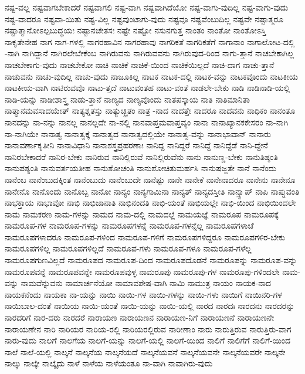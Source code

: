 {ನಷ್ಟ-ವಲ್ಲ
ನಷ್ಟವಾಗಬೇಕಾದರೆ
ನಷ್ಟವಾಗಲಿ
ನಷ್ಟ-ವಾಗಿ
ನಷ್ಟವಾಗಿದೆಯೋ
ನಷ್ಟ-ವಾಗು-ವುದಿಲ್ಲ
ನಷ್ಟ-ವಾಗು-ವುದು
ನಷ್ಟ-ವಾದರೂ
ನಷ್ಟವಾ-ಯಿತು
ನಷ್ಟ-ವಿಲ್ಲ
ನಷ್ಟವುಂಟಾಗು-ವುದು
ನಷ್ಟವೂ
ನಷ್ಟವೆಂಬುದಿಲ್ಲ
ನಷ್ಟವೇ
ನಷ್ಟಾತ್ಮರೂ
ನಷ್ಟಾತ್ಮಾನೋಽಲ್ಪಬುದ್ಧಯಃ
ನಷ್ಟಾನಚೇತಸಃ
ನಷ್ಟೇ
ನಷ್ಟೋ
ನಸುನಗುತ್ತ
ನಾಂತಂ
ನಾಂತೋ
ನಾಂತೋಽಸ್ತಿ
ನಾಕೃತೇನೇಹ
ನಾಗ
ನಾಗ-ಗಳಲ್ಲಿ
ನಾಗರಹಾವಿನ
ನಾಗರಹಾವು
ನಾಗರಿಕತೆ
ನಾಗರಿಕತೆಗೆ
ನಾಗಾನಾಂ
ನಾಗಾಲೋಟ-ದಲ್ಲಿ
-ನಾಗಿ
ನಾಗಿದ್ದಾನೆ
ನಾಗಿರಲೇಬೇಕೆಂಬ
ನಾಗಿರುವನು
ನಾಗಿರುವವನು
ನಾಗಿರುವುದ-ರಿಂದ
ನಾಗು-ತ್ತಾನೆ
ನಾಚಬೇಕಾಗಿಲ್ಲ
ನಾಚಬೇಕಾಗು-ವುದು
ನಾಚಬೇಕೋ
ನಾಚಿ
ನಾಚಿಕೆ
ನಾಚಿಕೆ-ಯಿಂದ
ನಾಚಿಕೆಯಿಲ್ಲದೆ
ನಾಚಿ-ದಾಗ
ನಾಚು-ತ್ತಾನೆ
ನಾಚುವನು
ನಾಚು-ವುದಿಲ್ಲ
ನಾಚು-ವುದು
ನಾಜೂಕಿಲ್ಲ
ನಾಟಕ
ನಾಟಕ-ದಲ್ಲಿ
ನಾಟಕ-ವನ್ನು
ನಾಟಕವೊಂದು
ನಾಟಕೀಯ
ನಾಟಕೀಯ-ವಾಗಿ
ನಾಟಿರುವವೊ
ನಾಟು-ತ್ತದೆ
ನಾಟುವಂತಹ
ನಾಟು-ವಂತೆ
ನಾಡಲೇ-ಬೇಕು
ನಾಡಿ
ನಾಡಿನಾಡಿ-ಯಲ್ಲಿ
ನಾಡಿ-ಯನ್ನು
ನಾಡೀಶಾಸ್ತ್ರ
ನಾಡು-ತ್ತಾನೆ
ನಾಣ್ಯದ
ನಾಣ್ಯವೊಂದು
ನಾತಪಸ್ಕಾಯ
ನಾತಿ
ನಾತಿಮಾನಿತಾ
ನಾತ್ಮಾನಮವಸಾದಯೇತ್
ನಾತ್ಯಶ್ನತಸ್ತು
ನಾತ್ಯುಚ್ಛ್ರಿತಂ
ನಾತ್ರ
-ನಾದ
ನಾದತ್ತೇ
ನಾದರೂ
ನಾದವನು
ನಾಧಿಕಂ
ನಾನಂತೂ
ನಾನದನ್ನು
ನಾ-ನನ್ನು
ನಾನಲ್ಲ
ನಾನಲ್ಲದೇ
ನಾ-ನಲ್ಲಿ
ನಾನವಾಪ್ತಮವಾಪ್ತವ್ಯಂ
ನಾನಾ
ನಾನಾಖ್ಯಾನಕಕೇಸರಂ
ನಾ-ನಾಗಿ
ನಾ-ನಾಗಿಯೇ
ನಾನಾತ್ವ
ನಾನಾತ್ವಕ್ಕೆ
ನಾನಾತ್ವದ
ನಾನಾತ್ವದಲ್ಲಿಯೇ
ನಾನಾತ್ವ-ವನ್ನು
ನಾನಾಭಾವಾನ್
ನಾನಾರು
ನಾನಾವರ್ಣಾಕೃತೀನಿ
ನಾನಾವಿಧಾನಿ
ನಾನಾಶಸ್ತ್ರಪ್ರಹರಣಾಃ
ನಾನಿದ್ದ
ನಾನಿದ್ದರೆ
ನಾನಿದ್ದೆ
ನಾನಿದ್ದೆಡೆ
ನಾನಿ-ದ್ದೇನೆ
ನಾನಿರಬೇಕಾದರೆ
ನಾನಿರ-ಬೇಕು
ನಾನಿರುವ
ನಾನಿಲ್ಲಿರುವೆ
ನಾನಿಲ್ಲಿರುವೆನು
ನಾನು
ನಾನುಣ್ಣ-ಬೇಕು
ನಾನುತಿಷ್ಠಂತಿ
ನಾನುಪಶ್ಯಂತಿ
ನಾನುವರ್ತಯತೀಹ
ನಾನುಶೋಚಂತಿ
ನಾನುಶೋಚಿತುಮರ್ಹಸಿ
ನಾನುಷಜ್ಜತೇ
ನಾನೆ
ನಾನೆಂದು
ನಾನೆಂಬ
ನಾನೆಂಬುದಕ್ಕಿಂತ
ನಾನೆಂಬುದು
ನಾನೆಂಬುದೇ
ನಾನೆಷ್ಟು
ನಾನೇ
ನಾನೇಕೆ
ನಾನೇನಾದರೂ
ನಾನೇನು
ನಾನೇನೂ
ನಾನೇನೊ
ನಾನೊಂದು
ನಾನೊಬ್ಬ
ನಾನೋ
ನಾನ್ಯಂ
ನಾನ್ಯಗಾಮಿನಾ
ನಾನ್ಯತ್
ನಾನ್ಯದಸ್ತೀತಿ
ನಾನ್ಸ್ಟಾಪ್
ನಾಪಿ
ನಾಪ್ನುವಂತಿ
ನಾಭಕ್ತಾಯ
ನಾಭಾವೋ
ನಾಭಿ
ನಾಭಿಜಾನಾತಿ
ನಾಭಿನಂದತಿ
ನಾಭಿ-ಯಂತೆ
ನಾಭಿಯಲ್ಲೇ
ನಾಭಿ-ಯಿಂದ
ನಾಭಿಯಿಂದಲೇ
ನಾಮ
ನಾಮಕರಣ
ನಾಮ-ಗಳನ್ನು
ನಾಮದ
ನಾಮ-ದಲ್ಲಿ
ನಾಮದಲ್ಲೆ
ನಾಮಯಜ್ಞೆ
ನಾಮರೂಪ
ನಾಮರೂಪಕ್ಕೆ
ನಾಮರೂಪ-ಗಳ
ನಾಮರೂಪ-ಗಳನ್ನು
ನಾಮರೂಪಗಳನ್ನೆ
ನಾಮರೂಪ-ಗಳನ್ನೆಲ್ಲ
ನಾಮರೂಪಗಳಾಚೆ
ನಾಮರೂಪಗಳಾದರೂ
ನಾಮರೂಪ-ಗಳಿಂದ
ನಾಮರೂಪ-ಗಳಿಗೆ
ನಾಮರೂಪಗಳಿದ್ದರೂ
ನಾಮರೂಪಗಳಿರ-ಬೇಕು
ನಾಮರೂಪಗಳಿಲ್ಲ
ನಾಮರೂಪಗಳಿಲ್ಲದೆ
ನಾಮರೂಪ-ಗಳು
ನಾಮರೂಪ-ಗಳೂ
ನಾಮರೂಪ-ಗಳೆಲ್ಲ
ನಾಮರೂಪಗುಣವಿಲ್ಲದೆ
ನಾಮರೂಪದ
ನಾಮರೂಪ-ದಿಂದ
ನಾಮರೂಪದೊಡನೆ
ನಾಮರೂಪನ್ನು
ನಾಮರೂಪ-ವನ್ನು
ನಾಮರೂಪವನ್ನೆ
ನಾಮರೂಪವನ್ನೇ
ನಾಮರೂಪವುಳ್ಳ
ನಾಮರೂಪು
ನಾಮರೂಪು-ಗಳ
ನಾಮರೂಪು-ಗಳಿಂದಲೇ
ನಾಮ-ವನ್ನು
ನಾಮವೆನ್ನುವನು
ನಾಮಾರ್ಚನೆಯೋ
ನಾಮಾವಶೇಷ-ವಾಗಿ
ನಾಮಿ
ನಾಮುತ್ರ
ನಾಯಂ
ನಾಯಕ-ನಾದ
ನಾಯಕನೆಂದು
ನಾಯಕಾ
ನಾ-ಯನ್ನು
ನಾಯಿ
ನಾಯಿ-ಗಳ
ನಾಯಿ-ಗಳನ್ನು
ನಾಯಿ-ಗಳು
ನಾಯಿಗೆ
ನಾಯಿನರಿ-ಗಳ
ನಾಯಿಬಾಲ-ದಂತೆ
ನಾಯಿಯ
ನಾಯಿ-ಯಂತೆ
ನಾಯಿ-ಯನ್ನು
ನಾಯಿ-ಯಲ್ಲಿ
ನಾರದ
ನಾರದಃ
ನಾರದನು
ನಾರದರನ್ನು
ನಾರದರಿಗೆ
ನಾರ-ದರು
ನಾರದರೆ
ನಾರಾಯಣ
ನಾರಾಯಣನ
ನಾರಾಯಣ-ನಿಗೆ
ನಾರಾಯಣನೆ
ನಾರಾಯಣನೇ
ನಾರಾಯಣೇನ
ನಾರಿ
ನಾರಿಯರ
ನಾರಿಯ-ರಲ್ಲಿ
ನಾರಿಯರಲ್ಲಿರುವ
ನಾರೀಣಾಂ
ನಾರು
ನಾರುತ್ತಿರುವ
ನಾರುತ್ತಿರು-ವಾಗ
ನಾರು-ವುದು
ನಾಲಗೆ
ನಾಲಗೆಯ
ನಾಲಗೆ-ಯನ್ನು
ನಾಲಗೆ-ಯಲ್ಲಿ
ನಾಲಗೆ-ಯಿಂದ
ನಾಲಿಗೆ
ನಾಲಿಗೆಗೆ
ನಾಲಿಗೆ-ಯಿಂದ
ನಾಲೆ
ನಾಲೆ-ಯಲ್ಲಿ
ನಾಲ್ಕನೆ
ನಾಲ್ಕನೆಯ
ನಾಲ್ಕನೆಯದೆ
ನಾಲ್ಕನೆಯವನೆ
ನಾಲ್ಕನೆಯವನೇ
ನಾಲ್ಕನೆಯವರೇ
ನಾಲ್ಕನೇ
ನಾಲ್ಕು
ನಾಲ್ಕೇ
ನಾಲ್ಕೈದು
ನಾಳೆ
ನಾಳೆಯ
ನಾಳೆಯಂತೂ
ನಾ-ವಾಗಿ
ನಾವಾಗಿರು-ವುದು
}
